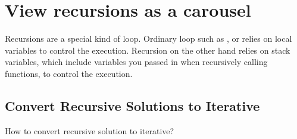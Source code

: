 
\chapter{View recursions as a carousel} \label{ch:recursion}
Recursions are a special kind of loop.
Ordinary loop such as ,  or  relies on local variables to
control the execution.
Recursion on the other hand relies on stack variables, which include variables you passed in when
recursively calling functions, to control the execution.

\section{Convert Recursive Solutions to Iterative}\label{sec:convertRecursiveSolutionsToIterative}

How to convert recursive solution to iterative?
